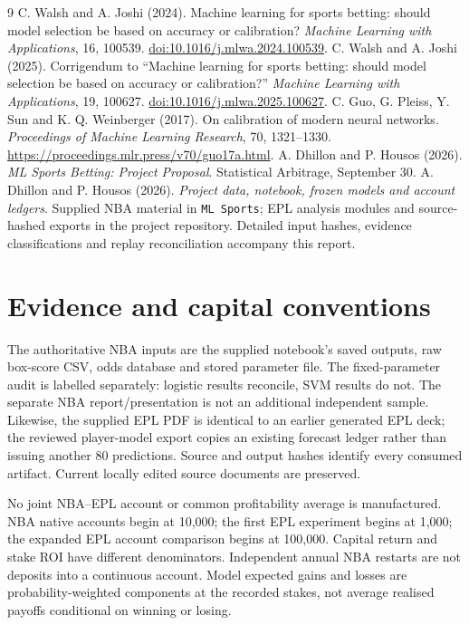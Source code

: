 \documentclass[11pt,letterpaper]{article}
\begin{document}
\clearpage
\begin{thebibliography}{9}
 C. Walsh and A. Joshi (2024).
Machine learning for sports betting: should model selection be based on accuracy or calibration?
\emph{Machine Learning with Applications}, 16, 100539.
\href{https://doi.org/10.1016/j.mlwa.2024.100539}{doi:10.1016/j.mlwa.2024.100539}.
 C. Walsh and A. Joshi (2025).
Corrigendum to ``Machine learning for sports betting: should model selection be based on accuracy or calibration?''
\emph{Machine Learning with Applications}, 19, 100627.
\href{https://doi.org/10.1016/j.mlwa.2025.100627}{doi:10.1016/j.mlwa.2025.100627}.
 C. Guo, G. Pleiss, Y. Sun and K. Q. Weinberger (2017).
On calibration of modern neural networks.
\emph{Proceedings of Machine Learning Research}, 70, 1321--1330.
\url{https://proceedings.mlr.press/v70/guo17a.html}.
 A. Dhillon and P. Housos (2026).
\emph{ML Sports Betting: Project Proposal}. Statistical Arbitrage, September 30.
 A. Dhillon and P. Housos (2026).
\emph{Project data, notebook, frozen models and account ledgers}.
Supplied NBA material in \texttt{ML Sports}; EPL analysis modules and
source-hashed exports in the project repository. Detailed input hashes,
evidence classifications and replay reconciliation accompany this report.
\end{thebibliography}

\clearpage
\appendix
\section{Evidence and capital conventions}
The authoritative NBA inputs are the supplied notebook's saved outputs,
raw box-score CSV, odds database and stored parameter file. The fixed-parameter
audit is labelled separately: logistic results reconcile, SVM results do not.
The separate NBA report/presentation is not an additional independent sample.
Likewise, the supplied EPL PDF is identical to an earlier generated EPL deck;
the reviewed player-model export copies an existing forecast ledger rather
than issuing another 80 predictions. Source and output hashes identify every
consumed artifact. Current locally edited source documents are preserved.

No joint NBA--EPL account or common profitability average is manufactured.
NBA native accounts begin at 10,000; the first EPL experiment begins at 1,000;
the expanded EPL account comparison begins at 100,000. Capital return and
stake ROI have different denominators. Independent annual NBA restarts are
not deposits into a continuous account. Model expected gains and losses are
probability-weighted components at the recorded stakes, not average
realised payoffs conditional on winning or losing.
\end{document}
